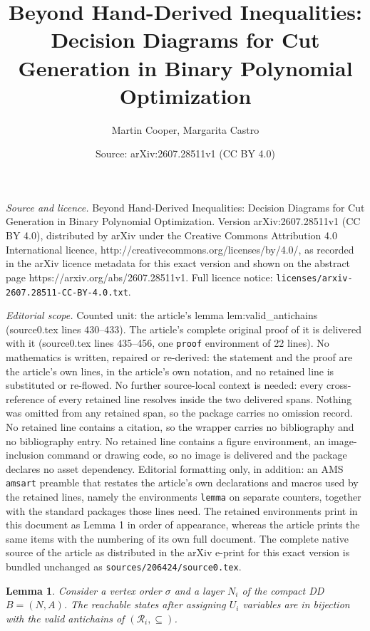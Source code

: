 \documentclass[10pt,a4paper]{amsart}
\title{Beyond Hand-Derived Inequalities: Decision Diagrams for Cut Generation in Binary Polynomial Optimization}
\author{Martin Cooper, Margarita Castro}
\date{Source: arXiv:2607.28511v1 (CC BY 4.0)}
\newtheorem{lemma}{Lemma}
\newcommand{\R}{\mathcal{R}}
\begin{document}
\maketitle

\noindent\emph{Source and licence.} Beyond Hand-Derived Inequalities: Decision Diagrams for Cut Generation in Binary Polynomial Optimization. Version arXiv:2607.28511v1 (CC BY 4.0), distributed by arXiv under the Creative Commons Attribution 4.0 International licence, http://creativecommons.org/licenses/by/4.0/, as recorded in the arXiv licence metadata for this exact version and shown on the abstract page https://arxiv.org/abs/2607.28511v1. Full licence notice: \texttt{licenses/arxiv-2607.28511-CC-BY-4.0.txt}.\par\smallskip

\noindent\textit{Editorial scope.} Counted unit: the article's lemma lem:valid\_antichains (source0.tex lines 430--433). The article's complete original proof of it is delivered with it (source0.tex lines 435--456, one \texttt{proof} environment of 22 lines). No mathematics is written, repaired or re-derived: the statement and the proof are the article's own lines, in the article's own notation, and no retained line is substituted or re-flowed.  No further source-local context is needed: every cross-reference of every retained line resolves inside the two delivered spans.  Nothing was omitted from any retained span, so the package carries no omission record.  No retained line contains a citation, so the wrapper carries no bibliography and no bibliography entry.  No retained line contains a figure environment, an image-inclusion command or drawing code, so no image is delivered and the package declares no asset dependency.  Editorial formatting only, in addition: an AMS \texttt{amsart} preamble that restates the article's own declarations and macros used by the retained lines, namely the environments \texttt{lemma} on separate counters, together with the standard packages those lines need.  The retained environments print in this document as Lemma 1 in order of appearance, whereas the article prints the same items with the numbering of its own full document.  The complete native source of the article as distributed in the arXiv e-print for this exact version is bundled unchanged as \texttt{sources/206424/source0.tex}.
\begin{lemma}
\label{lem:valid_antichains}
Consider a vertex order $\sigma$ and a layer $N_i$ of the compact DD $B=(N,A)$. The reachable states after assigning $U_i$ variables are in bijection with the valid antichains of $(\R_i,\subseteq)$.
\end{lemma}
\end{document}
